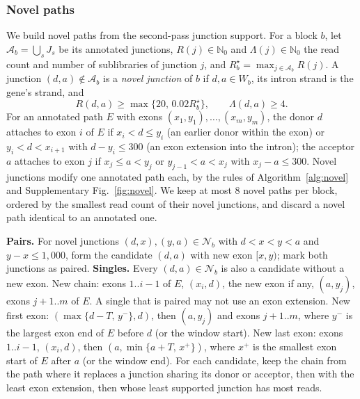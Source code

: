 \documentclass[11pt]{article}
\begin{document}
\subsubsection{Novel paths}
\label{sec:novel}

We build novel paths from the second-pass junction support. For a block $b$, let $\mathcal A_b=\bigcup_sJ_s$ be its annotated junctions, $R(j)\in\mathbb N_0$ and $\Lambda(j)\in\mathbb N_0$ the read count and number of sublibraries of junction $j$, and $R_b^\star=\max_{j\in\mathcal A_b}R(j)$. A junction $(d,a)\notin\mathcal A_b$ is a \emph{novel junction} of $b$ if $d,a\in W_b$, its intron strand is the gene's strand, and \[R(d,a)\ge\max\{20,\,0.02R_b^\star\},\qquad \Lambda(d,a)\ge4.\] For an annotated path $E$ with exons $(x_1,y_1),\ldots,(x_m,y_m)$, the donor $d$ attaches to exon $i$ of $E$ if $x_i<d\le y_i$ (an earlier donor within the exon) or $y_i<d<x_{i+1}$ with $d-y_i\le300$ (an exon extension into the intron); the acceptor $a$ attaches to exon $j$ if $x_j\le a<y_j$ or $y_{j-1}<a<x_j$ with $x_j-a\le300$. Novel junctions modify one annotated path each, by the rules of Algorithm~\ref{alg:novel} and Supplementary Fig.~\ref{fig:novel}. We keep at most 8 novel paths per block, ordered by the smallest read count of their novel junctions, and discard a novel path identical to an annotated one.

\begin{algorithm}[ht]
\caption{Novel paths of block $b$ from its novel junctions $\mathcal N_b$; $T=151$ is the new terminal exon length.}
\label{alg:novel}
\begin{algorithmic}[1]
\State \textbf{Pairs.} For novel junctions $(d,x),(y,a)\in\mathcal N_b$ with $d<x<y<a$ and $y-x\le1{,}000$, form the candidate $(d,a)$ with new exon $[x,y)$; mark both junctions as paired.
\State \textbf{Singles.} Every $(d,a)\in\mathcal N_b$ is also a candidate without a new exon.
    \State New chain: exons $1..i-1$ of $E$, $(x_i,d)$, the new exon if any, $(a,y_j)$, exons $j+1..m$ of $E$. A single that is paired may not use an exon extension.
    \State New first exon: $(\max\{d-T,\,y^-\},d)$, then $(a,y_j)$ and exons $j+1..m$, where $y^-$ is the largest exon end of $E$ before $d$ (or the window start).
    \State New last exon: exons $1..i-1$, $(x_i,d)$, then $(a,\min\{a+T,\,x^+\})$, where $x^+$ is the smallest exon start of $E$ after $a$ (or the window end).
  \EndIf
\EndFor
\State For each candidate, keep the chain from the path where it replaces a junction sharing its donor or acceptor, then with the least exon extension, then whose least supported junction has most reads.
\end{algorithmic}
\end{algorithm}
\end{document}
